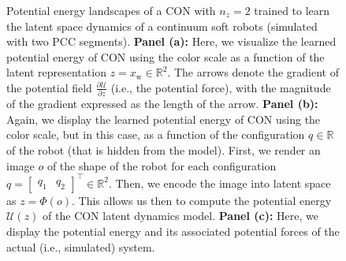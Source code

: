 \begin{figure}[ht]
    \caption{Potential energy landscapes of a \gls{CON} with $n_z=2$ trained to learn the latent space dynamics of a continuum soft robots (simulated with two \gls{PCC} segments). \textbf{Panel (a):} Here, we visualize the learned potential energy of \gls{CON} using the color scale as a function of the latent representation $z = x_\mathrm{w} \in \mathbb{R}^2$. The arrows denote the gradient of the potential field $\frac{\partial \mathcal{U}}{\partial z}$ (i.e., the potential force), with the magnitude of the gradient expressed as the length of the arrow. \textbf{Panel (b):} Again, we display the learned potential energy of \gls{CON} using the color scale, but in this case, as a function of the configuration $q \in \mathbb{R}$ of the robot (that is hidden from the model). First, we render an image $o$ of the shape of the robot for each configuration $q = \begin{bmatrix}
        q_1 & q_2
    \end{bmatrix}^\top \in \mathbb{R}^2$. Then, we encode the image into latent space as $z = \Phi(o)$. This allows us then to compute the potential energy $\mathcal{U}(z)$ of the \gls{CON} latent dynamics model. \textbf{Panel (c):} Here, we display the potential energy and its associated potential forces of the actual (i.e., simulated) system.}
\end{figure}

